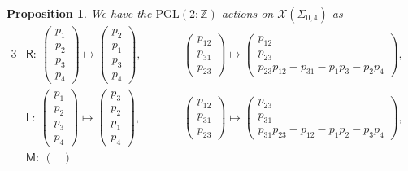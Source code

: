 \documentclass[10pt,a4paper]{amsart}
\numberwithin{equation}{section}
\newtheorem{Proposition}[Theorem]{Proposition}
 { \theoremstyle{definition}
\newtheorem{Definition}[Theorem]{Definition}
\newtheorem{Note}[Theorem]{Note}
\newtheorem{Example}[Theorem]{Example}
\newtheorem{Remark}[Theorem]{Remark} }
\begin{document}
\begin{Proposition} We have the $\mathrm{PGL}(2;\mathbb{Z})$ actions on $\mathcal{X}(\Sigma_{0,4})$ as
 \begin{alignat*}{3}
 & \mathsf{R} \colon \ \left( \begin{matrix}
 {p}_1 \\
 {p}_2 \\
 {p}_3 \\
 {p}_4
 \end{matrix} \right) \mapsto \left( \begin{matrix}
 {p}_2 \\
 {p}_1 \\
 {p}_3 \\
 {p}_4
 \end{matrix}
 \right),
 \qquad &&
 \left( \begin{matrix}
 p_{12} \\
 p_{31} \\
 p_{23}
 \end{matrix}
 \right)
 \mapsto
 \left( \begin{matrix}
 p_{12} \\
 p_{23} \\
 p_{23} p_{12} - p_{31} - p_1 p_3 - p_2 p_4
 \end{matrix} \right) ,& \\
 & \mathsf{L}\colon \ \left( \begin{matrix}
 {p}_1 \\
 {p}_2 \\
 {p}_3 \\
 {p}_4
 \end{matrix}
 \right)
 \mapsto
 \left( \begin{matrix}
 {p}_3 \\
 {p}_2 \\
 {p}_1 \\
 {p}_4
 \end{matrix}
 \right),
 \qquad &&
 \left( \begin{matrix}
 p_{12} \\
 p_{31} \\
 p_{23}
 \end{matrix}
 \right)
 \mapsto \left( \begin{matrix}
 p_{23} \\
 p_{31} \\
 p_{31} p_{23} - p_{12} - p_1 p_2 - p_3 p_4
 \end{matrix}
 \right) , & \\
 & \mathsf{M} \colon \
 \begin{pmatrix}

\end{pmatrix}
\end{alignat*}
\end{Proposition}
\end{document}

